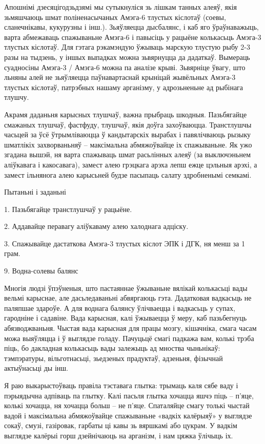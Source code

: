 Апошнімі дзесяцігодзьдзямі мы сутыкнуліся зь лішкам танных алеяў, якія зьмяшчаюць шмат поліненасычаных Амэга-6 тлустых кіслотаў (соевы, сланечнікавы, кукурузны і інш.). Зьяўляецца дысбалянс, і каб яго ўраўнаважыць, варта абмежаваць спажываньне Амэга-6 і павысіць у рацыёне колькасьць Амэга-3 тлустых кіслотаў. Для гэтага рэкамэндую ўжываць марскую тлустую рыбу 2-3 разы на тыдзень, у іншых выпадках можна зьвярнуцца да дадаткаў. Вымераць суадносіны Амэга-3 / Амэга-6 можна па аналізе крыві. Зьвярніце ўвагу, што льняны алей не зьяўляецца паўнавартаснай крыніцай жывёльных Амэга-3 тлустых кіслотаў, патрэбных нашаму арганізму, у адрозьненьне ад рыбінага тлушчу.

Акрамя даданьня карысных тлушчаў, важна прыбраць шкодныя. Пазьбягайце смажаных тлушчаў, фастфуду, тлушчаў, якія доўга захоўваюцца. Транстлушчы часьцей за ўсё ўтрымліваюцца ў кандытарскіх вырабах і павялічваюць рызыку шматлікіх захворваньняў – максімальна абмяжоўвайце іх спажываньне. Як ужо згадана вышэй, ня варта спажываць шмат расьлінных алеяў (за выключэньнем аліўкавага і какосавага), замест алею грэцкага арэха лепш ежце цэльныя арэхі, а замест ільнянога алею карысьней будзе пасыпаць салату здробненымі семкамі.

Пытаньні і заданьні

1. Пазьбягайце транстлушчаў у рацыёне.

2. Аддавайце перавагу аліўкаваму алею халоднага адціску.

3. Спажывайце дастаткова Амэга-3 тлустых кіслот ЭПК і ДГК, ня менш за 1 грам.


9. Водна-солевы балянс

Многія людзі ўпэўненыя, што пастаяннае ўжываньне вялікай колькасьці вады вельмі карыснае, але дасьледаваньні абвяргаюць гэта. Дадатковая вадкасьць не паляпшае здароўе. А для воднага балянсу ўлічваецца і вадкасьць у супах, гародніне і садавіне. Вада карысная, калі ўжываецца ў меру, каб пазьбегнуць абязводжваньня. Чыстая вада карысная для працы мозгу, кішачніка, смага часам можа выяўляцца і ў выглядзе голаду. Пачуцьцё смагі падкажа вам, колькі трэба піць, бо дакладная колькасьць вады залежыць ад мноства чыньнікаў: тэмпэратуры, вільготнасьці, зьедзеных прадуктаў, адзеньня, фізычнай актыўнасьці ды інш.

Я раю выкарыстоўваць правіла тэставага глытка: трымаць каля сябе ваду і пэрыядычна адпіваць па глытку. Калі пасьля глытка хочацца яшчэ піць – п'яце, колькі хочацца, ня хочацца больш – не п'яце. Спаталяйце смагу толькі чыстай вадой і максімальна абмяжоўвайце спажываньне «вадкіх калёрыяў» у выглядзе сокаў, смузі, газіровак, гарбаты ці кавы зь вяршкамі або цукрам. У вадкім выглядзе калёрыі горш дзейнічаюць на арганізм, і нам цяжка ўлічыць іх.

